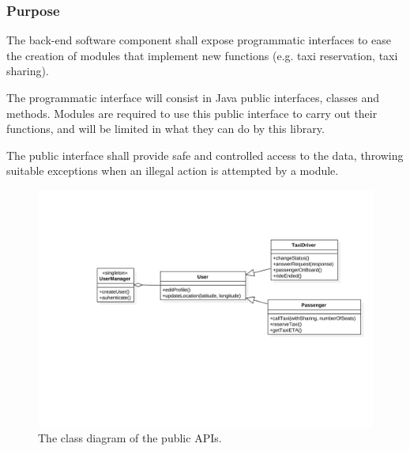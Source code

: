 \label{sec:api}
\subsubsection{Purpose}

The back-end software component shall expose programmatic interfaces to ease the creation of modules that implement new functions (e.g. taxi reservation, taxi sharing).

The programmatic interface will consist in Java public interfaces, classes and methods.
Modules are required to use this public interface to carry out their functions, and will be limited in what they can do by this library.

The public interface shall provide safe and controlled access to the data, throwing suitable exceptions when an illegal action is attempted by a module.

\begin{figure}
\includegraphics[width=\textwidth]{diagrams/class_programmatic.pdf}
\caption{The class diagram of the public APIs.}
\end{figure}

